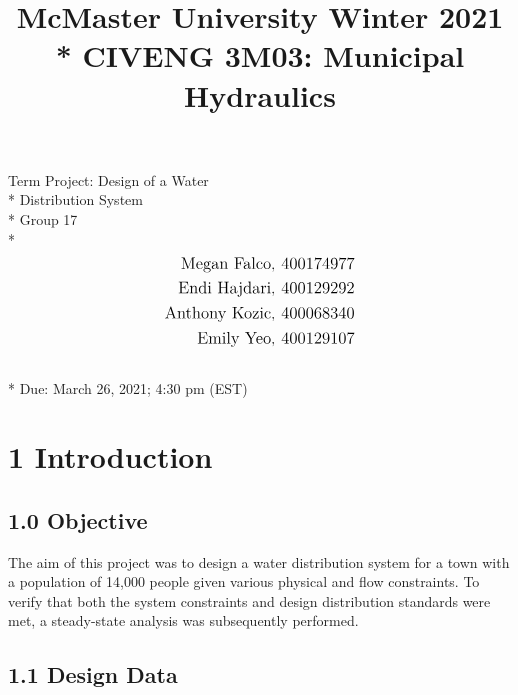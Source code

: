 \documentclass[]{article}
\title{\large{McMaster University Winter 2021} \LARGE \\* CIVENG 3M03: Municipal Hydraulics}
\date{}
\begin{document}
	\maketitle
	\thispagestyle{empty}
	\begin{center}
		\vspace{3.7cm}
		\Huge Term Project: Design of a Water \\* Distribution System\\* \vspace{1.1cm}
		\Large Group 17 \\* \vspace{0.9cm}
		\begin{align}
		\nonumber
		\large 
		\text{Megan Falco}, \; \text{400174977}\\ \nonumber \large
		\text{Endi Hajdari},  \; \text{400129292} \\ \nonumber \large
		\text{Anthony Kozic}, \; \text{400068340} \\ \nonumber \large
		\text{Emily Yeo}, \; \text{400129107}
		\end{align} \\* \vspace{3.1 cm}
		\large Due: March 26, 2021; 4:30 pm (EST) 
	\end{center}	
	\newpage
	\doublespacing
	\tableofcontents
	\singlespacing
	\newpage 
	\doublespacing
	\listoffigures
	\listoftables
	\singlespacing
	\newpage 
	\section{1 Introduction}
	\subsection{1.0 Objective}
	\noindent The aim of this project was to design a water distribution system for a town with a population of 14,000 people given various physical and flow constraints. To verify that both the system constraints and design distribution standards were met, a steady-state analysis was subsequently performed. 
	\subsection{1.1 Design Data}
\end{document}
